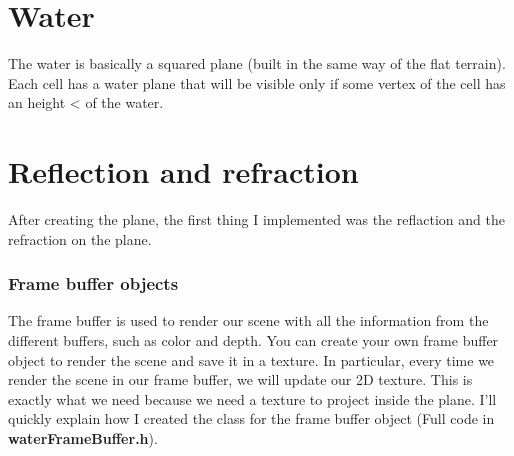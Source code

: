\section{Water}
The water is basically a squared plane (built in the same way of the flat terrain). Each cell has a water plane that will be visible only if some vertex of the cell has an height < of the water.

\begin{figure}[hbt!]
	\centering
	\qquad
	\caption{}
\end{figure}

\section{Reflection and refraction}
After creating the plane, the first thing I implemented was the reflaction and the refraction on the plane.

\subsubsection{Frame buffer objects}
The frame buffer is used to render our scene with all the information from the different buffers, such as color and depth. You can create your own frame buffer object to render the scene and save it in a texture. In particular, every time we render the scene in our frame buffer, we will update our 2D texture. This is exactly what we need because we need a texture to project inside the plane.
I'll quickly explain how I created the class for the frame buffer object (Full code in \textbf{waterFrameBuffer.h}).

